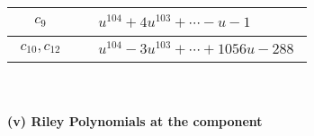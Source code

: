 \documentclass[1p]{elsarticle_modified}
\theoremstyle{definition}
\begin{document}
\begin{tabular}{m{50pt}|m{274pt}}
\hline $$\begin{aligned}c_{9}\end{aligned}$$&$\begin{aligned}
&u^{104}+4 u^{103}+\cdots- u-1
\end{aligned}$\\
\hline $$\begin{aligned}c_{10},c_{12}\end{aligned}$$&$\begin{aligned}
&u^{104}-3 u^{103}+\cdots+1056 u-288
\end{aligned}$\\
\hline
\end{tabular}\\~\\
\newpage\renewcommand{\arraystretch}{1}
\flushleft \textbf{(v) Riley Polynomials at the component}\newline \\
\end{document}
